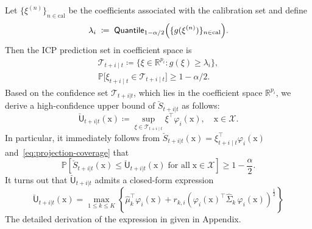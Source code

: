 \documentclass[lettersize,journal]{IEEEtran}
\begin{document}
Let $\{\xi^{(n)}\}_{n\in\mathrm{cal}}$ be the coefficients associated with the calibration set and define
\begin{equation*}
\lambda_i \;\coloneqq\; \mathsf{Quantile}_{1-\alpha/2}\Bigl(\{ g(\xi^{(n)}) \}_{n\in\mathrm{cal}} \Bigr).
\end{equation*}
Then the ICP prediction set in coefficient space is
\begin{equation}\label{eq:projection-coverage}
\begin{gathered}
\mathscr{T}_{t+i\mid t} \coloneqq \{\xi\in\mathbb{R}^{p_i}: g(\xi)\ge \lambda_i\}, \\
\mathbb{P}\bigl[\xi_{t+i\mid t}\in\mathscr{T}_{t+i\mid t}\bigr]\ge 1-\alpha/2.
\end{gathered}
\end{equation}
Based on the confidence set $\mathscr{T}_{t+i|t}$, which lies in the coefficient space $\mathbb{R}^{p_i}$, we derive a high-confidence upper bound of $\breve{S}_{t+i|t}$ as follows:
\begin{equation*}
\breve{\mathsf{U}}_{t+i|t}(\mathrm{x}) \coloneqq \sup_{\xi\in\mathscr{T}_{t+i\mid t}} \xi^\top \varphi_i(\mathrm{x}), \quad \mathrm{x} \in \mathcal{X}.
\end{equation*}
In particular, it immediately follows from $\breve{S}_{t+i|t}(\mathrm{x})=\xi^\top_{t+i\mid t} \varphi_i(\mathrm{x})$ and~\eqref{eq:projection-coverage} that
\begin{equation}\label{eq:fcp-prob-bound}
\mathbb{P}\left[\breve{S}_{t+i|t}(\mathrm{x})\leq \breve{\mathsf{U}}_{t+i|t}(\mathrm{x})\; \text{for all}\; \mathrm{x} \in \mathcal{X}\right]\ge 1-\frac{\alpha}{2}.
\end{equation}
It turns out that $\breve{\mathsf{U}}_{t+i|t}$ admits a closed-form expression
\begin{equation*}
\breve{\mathsf{U}}_{t+i|t}(\mathrm{x})= \max_{1\leq k\leq K} \left\{ \widehat\mu_k^\top \varphi_i(\mathrm{x})
+
r_{k,i}\left(\varphi_i(\mathrm{x})^\top \widehat\Sigma_k\, \varphi_i(\mathrm{x})\right)^{\frac{1}{2}} \right\}
\end{equation*}
The detailed derivation of the expression in given in Appendix.
\end{document}

